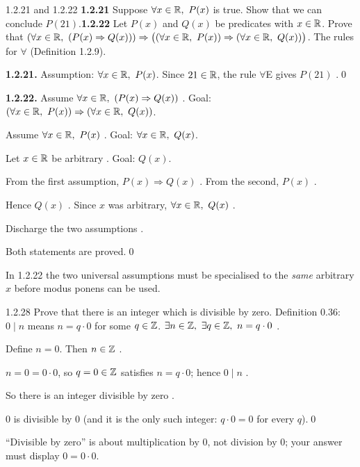 \begin{bookex}[recommended]{1.2.21 and 1.2.22}
\textbf{1.2.21} Suppose $\forall x\in\mathbb{R},\ P(x)$ is true. Show that we can conclude $P(21)$.\quad \textbf{1.2.22} Let $P(x)$ and $Q(x)$ be predicates with $x\in\mathbb{R}$. Prove that $(\forall x\in\mathbb{R},\ (P(x)\Rightarrow Q(x)))\Rightarrow\big((\forall x\in\mathbb{R},\ P(x))\Rightarrow(\forall x\in\mathbb{R},\ Q(x))\big)$.
\solution
\given The rules for $\forall$ (Definition 1.2.9).
\begin{steps}
\item \textbf{1.2.21.} Assumption: $\forall x\in\mathbb{R},\ P(x)$. Since $21\in\mathbb{R}$, the rule $\forall$E gives $P(21)$ .\qed
\item \textbf{1.2.22.} Assume $\forall x\in\mathbb{R},\ (P(x)\Rightarrow Q(x))$ . Goal: $(\forall x\in\R,\ P(x))\Rightarrow(\forall x\in\R,\ Q(x))$.
\item Assume $\forall x\in\mathbb{R},\ P(x)$ . Goal: $\forall x\in\mathbb{R},\ Q(x)$.
\item Let $x\in\mathbb{R}$ be arbitrary . Goal: $Q(x)$.
\item From the first assumption, $P(x)\Rightarrow Q(x)$ . From the second, $P(x)$ .
\item Hence $Q(x)$ . Since $x$ was arbitrary, $\forall x\in\mathbb{R},\ Q(x)$ .
\item Discharge the two assumptions .
\end{steps}
\conclusion Both statements are proved.\qed
\begin{compare}
\item In 1.2.22 the two universal assumptions must be specialised to the \emph{same} arbitrary $x$ before modus ponens can be used.
\end{compare}
\end{bookex}

\begin{bookex}[recommended]{1.2.28}
Prove that there is an integer which is divisible by zero.
\solution
\given Definition 0.36: $0\mid n$ means $n=q\cdot0$ for some $q\in\mathbb{Z}$.
\goal $\exists n\in\mathbb{Z},\ \exists q\in\mathbb{Z},\ n=q\cdot0$ .
\begin{steps}
\item Define $n=0$. Then $n\in\mathbb{Z}$ .
\item $n=0=0\cdot0$, so $q=0\in\mathbb{Z}$ satisfies $n=q\cdot0$; hence $0\mid n$ .
\item So there is an integer divisible by zero .
\end{steps}
\conclusion $0$ is divisible by $0$ (and it is the only such integer: $q\cdot0=0$ for every $q$).\qed
\begin{compare}
\item ``Divisible by zero'' is about multiplication by $0$, not division by $0$; your answer must display $0=0\cdot0$.
\end{compare}
\end{bookex}

